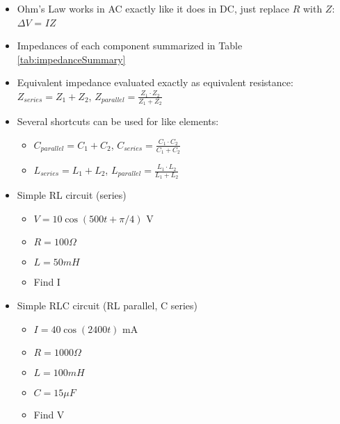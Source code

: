 
\begin{itemize}
\item Ohm's Law works in AC exactly like it does in DC, just replace $R$ with $Z$: $\Delta V$ = $I Z$
\item Impedances of each component summarized in
  Table \ref{tab:impedanceSummary}
\item Equivalent impedance evaluated exactly as equivalent resistance:
  $Z_{series} = Z_1+Z_2$, $Z_{parallel}=\frac{Z_1\cdot Z_2}{Z_1+Z_2}$
\item Several shortcuts can be used for like elements:
  \begin{itemize}
  \item $C_{parallel}=C_1+C_2$, $C_{series} = \frac{C_1\cdot C_2}{C_1+C_2}$
  \item $L_{series} = L_1+L_2$, $L_{parallel} = \frac{L_1\cdot L_2}{L_1+L_2}$
  \end{itemize}
\end{itemize}


\begin{itemize}
\item Simple RL circuit (series)
  \begin{itemize}
  \item $V = 10 \cos (500 t + \pi / 4)$ V
  \item $R = 100 \Omega$
  \item $L = 50 mH$
  \item Find I
  \end{itemize}
\item Simple RLC circuit (RL parallel, C series)
  \begin{itemize}
  \item $I = 40 \cos (2400 t)$ mA
  \item $R = 1000 \Omega$
  \item $L = 100 mH$
  \item $C = 15 \mu F$
  \item Find V
  \end{itemize}
\end{itemize}
